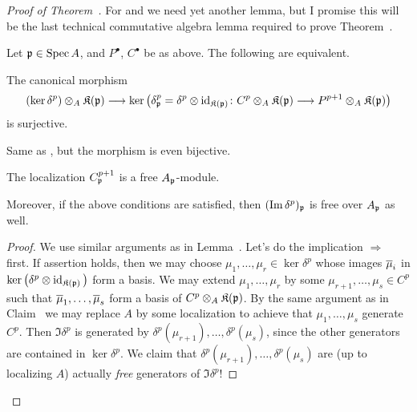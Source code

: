 \documentclass[a4paper,parskip=half,numbers=enddot, DIV=12]{scrreprt}
\begin{document}
\begin{proof}[Proof of Theorem~]
	For  and  we need yet another lemma, but I promise this will be the last technical commutative algebra lemma required to prove Theorem~.
	\begin{lem}
		Let $\mathfrak{p}\in \operatorname{Spec} A$, and $P^\bullet$, $C^\bullet$ be as above. The following are equivalent.
		\begin{alphanumerate}
			\item The canonical morphism
			\begin{align*}
				(\ker\delta^p)\otimes_A\KK(\pp)\morphism\ker\left(\delta^p_\pp=\delta^p\otimes \id_{\KK(\pp)}\colon C^p\otimes_A\KK(\pp)\morphism P^{p+1}\otimes_A\KK(\pp)\right)
			\end{align*}
			is surjective.
			\item Same as , but the morphism is even bijective.
			\item The localization $C^{p+1}_{\mathfrak{p}}$ is a free $A_{\mathfrak{p}}$-module.
		\end{alphanumerate}
		Moreover, if the above conditions are satisfied, then $(\operatorname{Im}\delta^p)_{\mathfrak{p}}$ is free over $A_{\mathfrak{p}}$ as well.
	\end{lem}
\begin{proof}
	We use similar arguments as in Lemma~. Let's do the implication  $\Rightarrow$  first. If assertion  holds, then we may choose $\mu_1,\ldots,\mu_r\in\ker \delta^p$ whose images $\overline{\mu}_i$ in $\ker\big(\delta^p\otimes\operatorname{id}_{\mathfrak{K}(\mathfrak{p})}\big)$ form a basis. We may extend $\mu_1,\ldots,\mu_r$ by some $\mu_{r+1},\ldots,\mu_s\in C^p$ such that $\overline{\mu}_1,\ldots,\overline{\mu}_s$ form a basis of $C^p\otimes_A\mathfrak{K}(\mathfrak{p})$. By the same argument as in Claim~ we may replace $A$ by some localization to achieve that $\mu_1,\ldots,\mu_s$ generate $C^p$. Then $\Im \delta^p$ is generated by $\delta^p(\mu_{r+1}),\ldots,\delta^p(\mu_s)$, since the other generators are contained in $\ker \delta^p$. We claim that $\delta^p(\mu_{r+1}),\ldots,\delta^p(\mu_s)$ are (up to localizing $A$) actually \emph{free} generators of $\Im\delta^p$!
	

\end{proof}
\end{proof}
\end{document}
